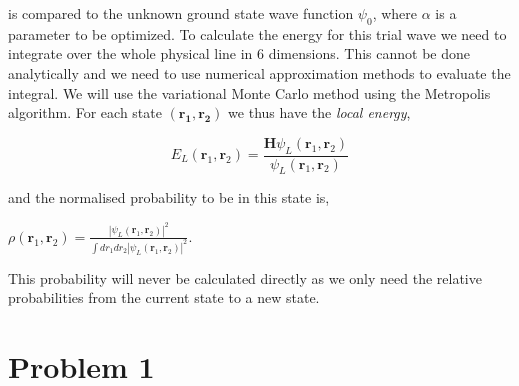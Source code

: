 is compared to the unknown ground state wave function $\psi_0$, where $\alpha$ is a parameter to be optimized. To calculate the energy for this trial wave we need to integrate over the whole physical line in 6 dimensions. This cannot be done analytically and we need to use numerical approximation methods to evaluate the integral. We will use the variational Monte Carlo method using the Metropolis algorithm. For each state $(\mathbf{r_1},\mathbf{r_2})$ we thus have the \textit{local energy},

\begin{equation}
E_{L}(\mathbf{r}_1,\mathbf{r}_2)= \frac{\mathbf{H}\psi_L(\mathbf{r}_1,\mathbf{r}_2)}{\psi_L(\mathbf{r}_1,\mathbf{r}_2)}
\end{equation}

and the normalised probability to be in this state is,

$\rho(\mathbf{r}_1,\mathbf{r}_2)=\frac{|\psi_L(\mathbf{r}_1,\mathbf{r}_2)|^2}{\int dr_1dr_2|\psi_L(\mathbf{r}_1,\mathbf{r}_2)|^2}$.

This probability will never be calculated directly as we only need the relative probabilities from the current state to a new state.


\section*{Problem 1}

